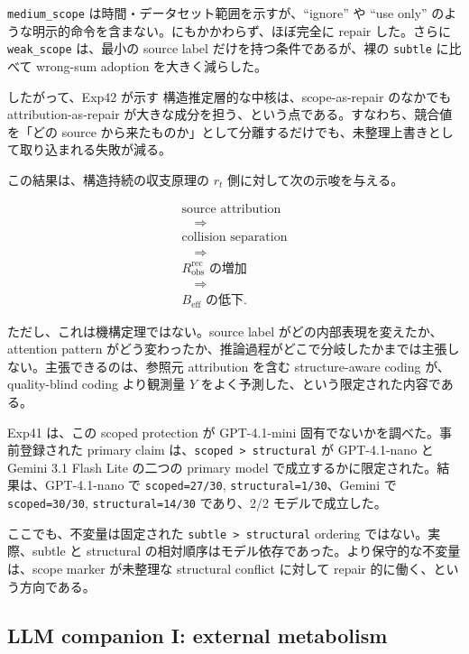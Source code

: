 \documentclass[12pt,a4paper]{article}
\begin{document}
\texttt{medium\_scope} は時間・データセット範囲を示すが、``ignore'' や ``use only'' のような明示的命令を含まない。にもかかわらず、ほぼ完全に repair した。さらに \texttt{weak\_scope} は、最小の source label だけを持つ条件であるが、裸の \texttt{subtle} に比べて wrong-sum adoption を大きく減らした。

したがって、Exp42 が示す 構造推定層的な中核は、scope-as-repair のなかでも attribution-as-repair が大きな成分を担う、という点である。すなわち、競合値を「どの source から来たものか」として分離するだけでも、未整理上書きとして取り込まれる失敗が減る。

この結果は、構造持続の収支原理の \(r_{t}\) 側に対して次の示唆を与える。

\[
\begin{aligned}
\text{source attribution} \\
\quad\Rightarrow\quad \\
\text{collision separation} \\
\quad\Rightarrow\quad \\
R_{\mathrm{obs}}^{\mathrm{rec}}\text{ の増加} \\
\quad\Rightarrow\quad \\
B_{\mathrm{eff}}\text{ の低下}.
\end{aligned}
\]

ただし、これは機構定理ではない。source label がどの内部表現を変えたか、attention pattern がどう変わったか、推論過程がどこで分岐したかまでは主張しない。主張できるのは、参照元 attribution を含む structure-aware coding が、quality-blind coding より観測量 \(Y\) をよく予測した、という限定された内容である。

Exp41 は、この scoped protection が GPT-4.1-mini 固有でないかを調べた。事前登録された primary claim は、\texttt{scoped\ \textgreater{}\ structural} が GPT-4.1-nano と Gemini 3.1 Flash Lite の二つの primary model で成立するかに限定された。結果は、GPT-4.1-nano で \texttt{scoped=27/30}, \texttt{structural=1/30}、Gemini で \texttt{scoped=30/30}, \texttt{structural=14/30} であり、2/2 モデルで成立した。

ここでも、不変量は固定された \texttt{subtle\ \textgreater{}\ structural} ordering ではない。実際、subtle と structural の相対順序はモデル依存であった。より保守的な不変量は、scope marker が未整理な structural conflict に対して repair 的に働く、という方向である。

\subsection{LLM companion I: external metabolism}\label{llm-companion-i-external-metabolism}
\end{document}
